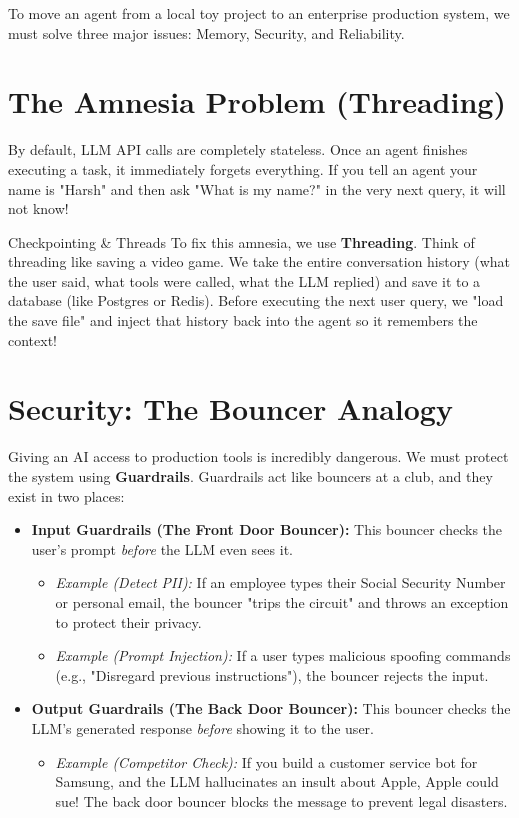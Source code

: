 \documentclass[12pt,a4paper,oneside]{book}
\begin{document}
To move an agent from a local toy project to an enterprise production system, we must solve three major issues: Memory, Security, and Reliability.

\section{The Amnesia Problem (Threading)}
By default, LLM API calls are completely stateless. Once an agent finishes executing a task, it immediately forgets everything. If you tell an agent your name is "Harsh" and then ask "What is my name?" in the very next query, it will not know!

\begin{concept}{Checkpointing \& Threads}
	To fix this amnesia, we use \textbf{Threading}. Think of threading like saving a video game. We take the entire conversation history (what the user said, what tools were called, what the LLM replied) and save it to a database (like Postgres or Redis). Before executing the next user query, we "load the save file" and inject that history back into the agent so it remembers the context!
\end{concept}

\section{Security: The Bouncer Analogy}
Giving an AI access to production tools is incredibly dangerous. We must protect the system using \textbf{Guardrails}. Guardrails act like bouncers at a club, and they exist in two places:

\begin{itemize}
	\item \textbf{Input Guardrails (The Front Door Bouncer):} This bouncer checks the user's prompt \textit{before} the LLM even sees it.
	      \begin{itemize}
		      \item \textit{Example (Detect PII):} If an employee types their Social Security Number or personal email, the bouncer "trips the circuit" and throws an exception to protect their privacy.
		      \item \textit{Example (Prompt Injection):} If a user types malicious spoofing commands (e.g., "Disregard previous instructions"), the bouncer rejects the input.
	      \end{itemize}
	\item \textbf{Output Guardrails (The Back Door Bouncer):} This bouncer checks the LLM's generated response \textit{before} showing it to the user.
	      \begin{itemize}
		      \item \textit{Example (Competitor Check):} If you build a customer service bot for Samsung, and the LLM hallucinates an insult about Apple, Apple could sue! The back door bouncer blocks the message to prevent legal disasters.
	      \end{itemize}
\end{itemize}
\end{document}
